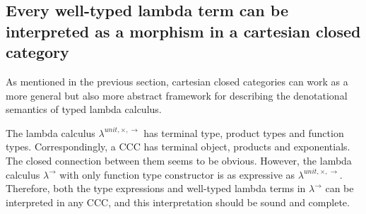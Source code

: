 \clearpage
\subsection{Every well-typed lambda term can be interpreted as a morphism in a cartesian closed category}
\label{sec:co_t2m}
As mentioned in the previous section, cartesian closed categories can work as a more general but also more abstract framework for describing the denotational semantics of typed lambda calculus.

The lambda calculus $ \lambda ^{unit, \times , \to } $ has terminal type, product types and function types. Correspondingly, a CCC has terminal object, products and exponentials. The closed connection between them seems to be obvious. However, the lambda calculus $ \lambda ^ \to $ with only function type constructor is as expressive as $ \lambda ^{unit, \times , \to } $. Therefore, both the type expressions and well-typed lambda terms in $ \lambda ^ \to $ can be interpreted in any CCC, and this interpretation should be sound and complete.

